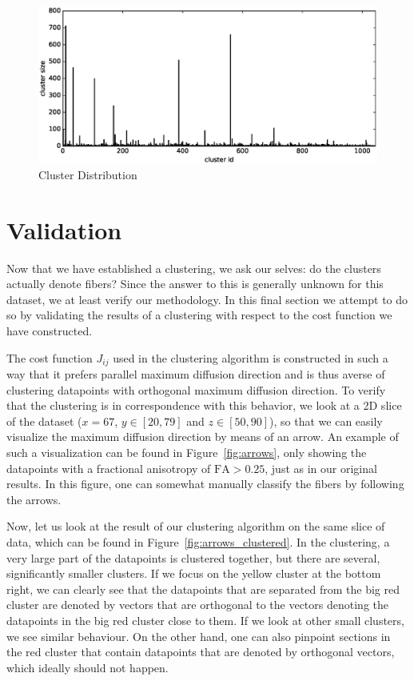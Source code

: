 \documentclass{article} %
\begin{document}
\begin{figure}[H]
  \begin{center}
    \includegraphics[width=\textwidth]{img/cluster_size.eps}
  \end{center}
  \caption{Cluster Distribution}
  \label{fig:clusteringdist}
\end{figure}

\section{Validation}
Now that we have established a clustering, we ask our selves: do the clusters actually denote fibers? Since the answer to this is generally unknown for this dataset, we at least verify our methodology. In this final section we attempt to do so by validating the results of a clustering with respect to the cost function we have constructed.

The cost function $J_{ij}$ used in the clustering algorithm is constructed in such a way that it prefers parallel maximum diffusion direction and is thus averse of clustering datapoints with orthogonal maximum diffusion direction. To verify that the clustering is in correspondence with this behavior, we look at a 2D slice of the dataset ($x=67$, $y \in [20,79]$ and $z \in [50,90]$), so that we can easily visualize the maximum diffusion direction by means of an arrow. An example of such a visualization can be found in Figure~\ref{fig:arrows}, only showing the datapoints with a fractional anisotropy of $\text{FA} > 0.25$, just as in our original results. In this figure, one can somewhat manually classify the fibers by following the arrows.

Now, let us look at the result of our clustering algorithm on the same slice of data, which can be found in Figure~\ref{fig:arrows_clustered}. In the clustering, a very large part of the datapoints is clustered together, but there are several, significantly smaller clusters. If we focus on the yellow cluster at the bottom right, we can clearly see that the datapoints that are separated from the big red cluster are denoted by vectors that are orthogonal to the vectors denoting the datapoints in the big red cluster close to them. If we look at other small clusters, we see similar behaviour. On the other hand, one can also pinpoint sections in the red cluster that contain datapoints that are denoted by orthogonal vectors, which ideally should not happen.
\end{document}

